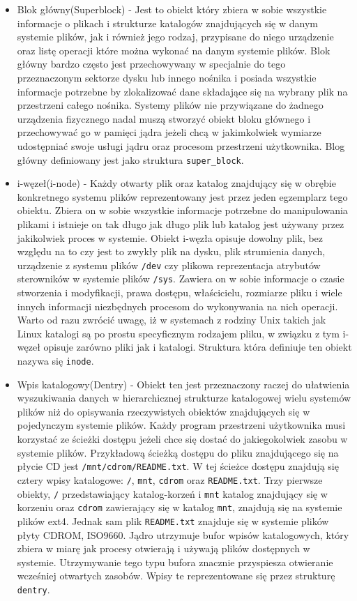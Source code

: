 \documentclass[10pt]{scrartcl}
\begin{document}
\begin{itemize}
\item
  Blok główny(Superblock) - Jest to obiekt który zbiera w sobie wszystkie informacje o plikach i strukturze katalogów znajdujących się w danym systemie plików, jak i również jego rodzaj, przypisane do niego urządzenie oraz listę operacji które można wykonać na danym systemie plików. Blok główny bardzo często jest przechowywany w specjalnie do tego przeznaczonym sektorze dysku lub innego nośnika i posiada wszystkie informacje potrzebne by zlokalizować dane składające się na wybrany plik na przestrzeni całego nośnika. Systemy plików nie przywiązane do żadnego urządzenia fizycznego nadal muszą stworzyć obiekt bloku głównego i przechowywać go w pamięci jądra jeżeli chcą w jakimkolwiek wymiarze udostępniać swoje usługi jądru oraz procesom przestrzeni użytkownika. Blog główny definiowany jest jako struktura \texttt{super\_block}.
\item
  i-węzeł(i-node) - Każdy otwarty plik oraz katalog znajdujący się w obrębie konkretnego systemu plików reprezentowany jest przez jeden egzemplarz tego obiektu. Zbiera on w sobie wszystkie informacje potrzebne do manipulowania plikami i istnieje on tak długo jak długo plik lub katalog jest używany przez jakikolwiek proces w systemie.  Obiekt i-węzła opisuje dowolny plik, bez względu na to czy jest to zwykły plik na dysku, plik strumienia danych, urządzenie z systemu plików \texttt{/dev} czy plikowa reprezentacja atrybutów sterowników w systemie plików \texttt{/sys}. Zawiera on w sobie informacje o czasie stworzenia i modyfikacji, prawa dostępu, właścicielu, rozmiarze pliku i wiele innych informacji niezbędnych procesom do wykonywania na nich operacji. Warto od razu zwrócić uwagę, iż w systemach z rodziny Unix takich jak Linux katalogi są po prostu specyficznym rodzajem pliku, w związku z tym i-węzeł opisuje zarówno pliki jak i katalogi. Struktura która definiuje ten obiekt nazywa się \texttt{inode}.
\item
  Wpis katalogowy(Dentry) - Obiekt ten jest przeznaczony raczej do ułatwienia wyszukiwania danych w hierarchicznej strukturze katalogowej wielu systemów plików niż do opisywania rzeczywistych obiektów znajdujących się w pojedynczym systemie plików. Każdy program przestrzeni użytkownika musi korzystać ze ścieżki dostępu jeżeli chce się dostać do jakiegokolwiek zasobu w systemie plików. Przykładową ścieżką dostępu do pliku znajdującego się na płycie CD jest \texttt{/mnt/cdrom/README.txt}. W tej ścieżce dostępu znajdują się cztery wpisy katalogowe: \texttt{/}, \texttt{mnt}, \texttt{cdrom} oraz \texttt{README.txt}. Trzy pierwsze obiekty, \texttt{/} przedstawiający katalog-korzeń i \texttt{mnt} katalog znajdujący się w korzeniu oraz \texttt{cdrom} zawierający się w katalog \texttt{mnt}, znajdują się na systemie plików ext4. Jednak sam plik \texttt{README.txt} znajduje się w systemie plików płyty CDROM, ISO9660. Jądro utrzymuje bufor wpisów katalogowych, który zbiera w miarę jak procesy otwierają i używają plików dostępnych w systemie. Utrzymywanie tego typu bufora znacznie przyspiesza otwieranie wcześniej otwartych zasobów. Wpisy te reprezentowane się przez strukturę \texttt{dentry}.

\end{itemize}
\end{document}
